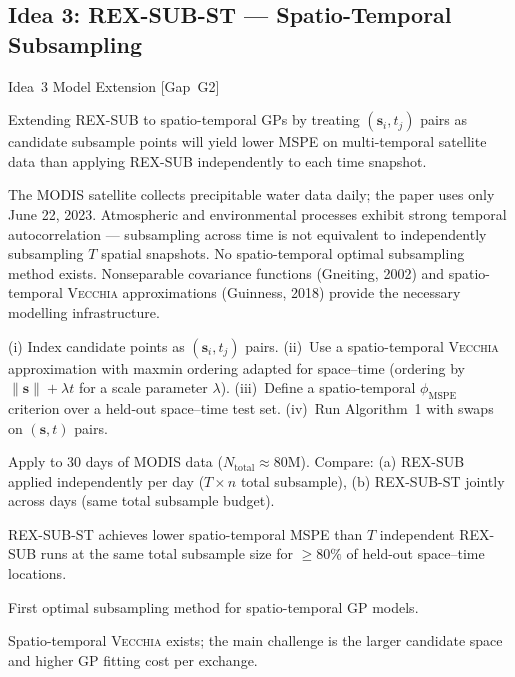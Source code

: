 \documentclass[12pt, a4paper]{article}
\newcommand{\novelty}[1]{\textbf{Novelty:} #1/5}
\newcommand{\feasibility}[1]{\textbf{Feasibility:} #1/5}
\newcommand{\mspe}{$\phi_{\text{MSPE}}$}
\newcommand{\Vecchia}{\textsc{Vecchia}}
\begin{document}
\subsection{Idea 3: REX-SUB-ST --- Spatio-Temporal Subsampling}

\begin{ideabox}{Idea~3 \textbullet{} Model Extension [Gap~G2]}

\begin{description}[leftmargin=5em, labelwidth=4.5em]
  \item[\textbf{Hypothesis}]
    Extending REX-SUB to spatio-temporal GPs by treating $(\mathbf{s}_i, t_j)$
    pairs as candidate subsample points will yield lower MSPE on multi-temporal
    satellite data than applying REX-SUB independently to each time snapshot.

  \item[\textbf{Motivation}]
    The MODIS satellite collects precipitable water data daily; the paper uses only
    June 22, 2023.  Atmospheric and environmental processes exhibit strong temporal
    autocorrelation --- subsampling across time is not equivalent to independently
    subsampling $T$ spatial snapshots.  No spatio-temporal optimal subsampling
    method exists.  Nonseparable covariance functions (Gneiting, 2002) and
    spatio-temporal \Vecchia{} approximations (Guinness, 2018) provide the necessary
    modelling infrastructure.

  \item[\textbf{Approach}]
    (i) Index candidate points as $(\mathbf{s}_i, t_j)$ pairs.
    (ii)~Use a spatio-temporal \Vecchia{} approximation with maxmin ordering adapted
    for space--time (ordering by $\|\mathbf{s}\| + \lambda t$ for a scale parameter
    $\lambda$).  (iii)~Define a spatio-temporal \mspe{} criterion over a held-out
    space--time test set.  (iv)~Run Algorithm~1 with swaps on $(\mathbf{s}, t)$ pairs.

  \item[\textbf{Key experiment}]
    Apply to 30 days of MODIS data ($N_{\text{total}} \approx 80$M).  Compare:
    (a) REX-SUB applied independently per day ($T \times n$ total subsample),
    (b) REX-SUB-ST jointly across days (same total subsample budget).

  \item[\textbf{Success criterion}]
    REX-SUB-ST achieves lower spatio-temporal MSPE than $T$ independent REX-SUB
    runs at the same total subsample size for $\geq 80\%$ of held-out space--time
    locations.

  \item[\novelty{5}]
    First optimal subsampling method for spatio-temporal GP models.

  \item[\feasibility{3}]
    Spatio-temporal \Vecchia{} exists; the main challenge is the larger candidate
    space and higher GP fitting cost per exchange.
\end{description}

\end{ideabox}
\end{document}
